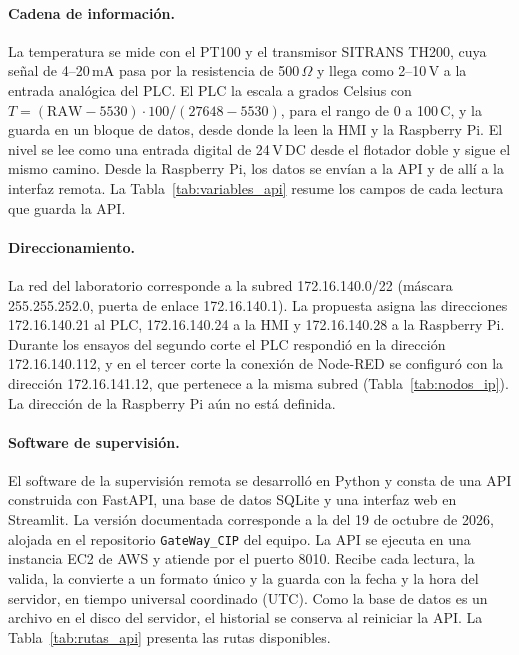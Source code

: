 \paragraph{Cadena de información.} La temperatura se mide con el PT100 y el transmisor SITRANS TH200, cuya señal de 4--20\,mA pasa por la resistencia de 500\,$\Omega$ y llega como 2--10\,V a la entrada analógica del PLC. El PLC la escala a grados Celsius con $T = (\mathrm{RAW} - 5530)\cdot 100/(27648 - 5530)$, para el rango de 0 a 100\,\textdegree C, y la guarda en un bloque de datos, desde donde la leen la HMI y la Raspberry Pi. El nivel se lee como una entrada digital de 24\,V\,DC desde el flotador doble y sigue el mismo camino. Desde la Raspberry Pi, los datos se envían a la API y de allí a la interfaz remota. La Tabla~\ref{tab:variables_api} resume los campos de cada lectura que guarda la API.



\paragraph{Direccionamiento.} La red del laboratorio corresponde a la subred 172.16.140.0/22 (máscara 255.255.252.0, puerta de enlace 172.16.140.1). La propuesta asigna las direcciones 172.16.140.21 al PLC, 172.16.140.24 a la HMI y 172.16.140.28 a la Raspberry Pi. Durante los ensayos del segundo corte el PLC respondió en la dirección 172.16.140.112, y en el tercer corte la conexión de Node-RED se configuró con la dirección 172.16.141.12, que pertenece a la misma subred (Tabla~\ref{tab:nodos_ip}). La dirección de la Raspberry Pi aún no está definida.

\paragraph{Software de supervisión.} El software de la supervisión remota se desarrolló en Python y consta de una API construida con FastAPI, una base de datos SQLite y una interfaz web en Streamlit. La versión documentada corresponde a la del 19 de octubre de 2026, alojada en el repositorio \texttt{GateWay\_CIP} del equipo. La API se ejecuta en una instancia EC2 de AWS y atiende por el puerto 8010. Recibe cada lectura, la valida, la convierte a un formato único y la guarda con la fecha y la hora del servidor, en tiempo universal coordinado (UTC). Como la base de datos es un archivo en el disco del servidor, el historial se conserva al reiniciar la API. La Tabla~\ref{tab:rutas_api} presenta las rutas disponibles.

